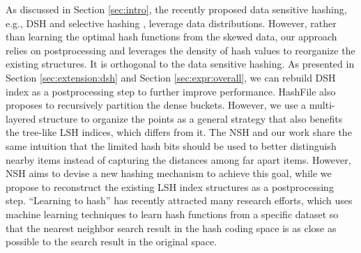  As discussed in Section \ref{sec:intro}, the recently proposed data sensitive hashing, e.g., DSH \cite{Gao:2014:DDS:2588555.2588565} and selective hashing \cite{Gao:2015:SHC:2783258.2783284}, leverage data distributions. However, rather than learning the optimal hash functions from the skewed data, our approach relies on postprocessing and leverages the density of hash values to reorganize the existing structures. It is orthogonal to the data sensitive hashing. As presented in Section \ref{sec:extension:dsh} and Section \ref{sec:expr:overall}, we can rebuild DSH index as a postprocessing step to further improve performance. HashFile \cite{Zhang:2011:HEI:2004686.2005629} also proposes to recursively partition the dense buckets. However, we use a multi-layered structure to organize the points as a general strategy that also benefits the tree-like LSH indices, which differs from it. The NSH \cite{Park:2015:NH:2850583.2850589} and our work share the same intuition that the limited hash bits should be used to better distinguish nearby items instead of capturing the distances among far apart items. However, NSH aims to devise a new hashing mechanism to achieve this goal, while we propose to reconstruct the existing LSH index structures as a postprocessing step. ``Learning to hash'' \cite{7915742} has recently attracted many research efforts, which uses machine learning techniques to learn hash functions from a specific dataset so that the nearest neighbor search result in the hash coding space is as close as possible to the search result in the original space.






